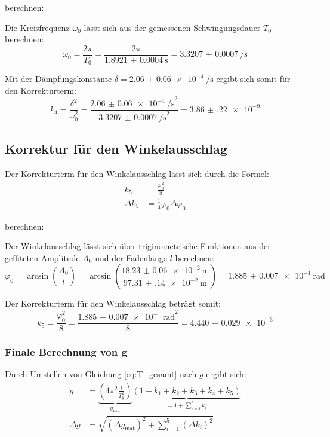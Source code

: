 \documentclass[12pt,a4paper,titlepage]{scrartcl}
\numberwithin{equation}{section}
\numberwithin{table}{section}
\numberwithin{figure}{section}
\begin{document}
berechnen:

Die Kreisfrequenz $\omega_0$ lässt sich aus der gemessenen Schwingungsdauer $T_0$ berechnen:
\begin{equation}
    \omega_0 = \frac{2\pi}{T_0} = \frac{2\pi}{\qty{1.8921(4)}{\second}} = \qty{3.3207(7)}{\per\second}
\end{equation}
 
Mit der Dämpfungskonstante $\delta = \qty{2.06(6)e-4}{\per\second}$ ergibt sich somit für den Korrekturterm:
\begin{equation}
    k_4 = \frac{\delta^2}{\omega_0^2} = \frac{\qty{2.06(6)e-4}{\per\second}^2}{\qty{3.3207(7)}{\per\second}^2} = \num{3.86(22)e-9}
\end{equation}

\subsection{Korrektur für den Winkelausschlag}

Der Korrekturterm für den Winkelausschlag lässt sich durch die Formel:
\begin{align}
    k_5 &= \frac{\varphi_0^2}{8}\\
    \Delta k_5 &= \frac{1}{4}\varphi_0 \Delta \varphi_0
\end{align}

berechnen:

Der Winkelausschlag lässt sich über triginometrische Funktionen aus der geffiteten Amplitude $A_0$ und der Fadenlänge $l$ berechnen:
\begin{equation}
    \varphi_0 = \arcsin\left(\frac{A_0}{l}\right) = \arcsin\left(\frac{\qty{18.23(6)e-2}{\meter}}{\qty{97.31(14)e-2}{\meter}}\right) = \qty{1.885(7)e-1}{\radian}
\end{equation}

Der Korrekturterm für den Winkelausschlag beträgt somit:
\begin{equation}
    k_5 = \frac{\varphi_0^2}{8} = \frac{\qty{1.885(7)e-1}{\radian}^2}{8} = \num{4.440(29)e-3}
\end{equation}


\subsubsection{Finale Berechnung von g}

Durch Umstellen von Gleichung \eqref{eq:T_gesamt} nach $g$ ergibt sich:
\begin{align}
    g &= \underbrace{\left(4\pi^2 \frac{l}{T_g^2}\right)}_{g_\text{mat}} \underbrace{(1 + k_1 + k_2 + k_3 + k_4 + k_5)}_{= 1 +\sum_{i=1}^{5}{k_i}}\\
    \Delta g &= \sqrt{\left(\Delta g_\text{mat}\right)^2 + \sum^5_{i=1}{\left(\Delta k_i\right)^\text{2}}}
\end{align}
\end{document}
